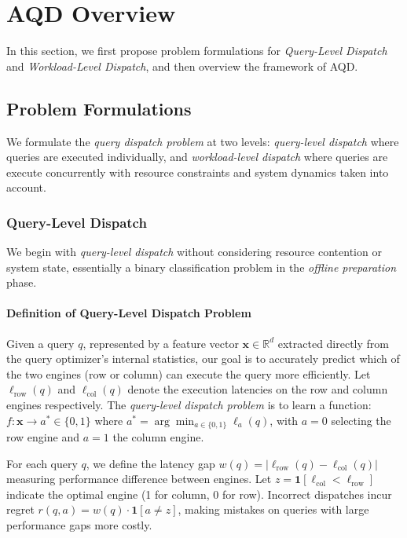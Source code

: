 \documentclass[sigconf, nonacm]{acmart}
\newcommand{\dispatcher}{AQD\xspace}
\begin{document}
\section{\dispatcher Overview}\label{sec:framework}
In this section, we first propose problem formulations for \emph{Query-Level Dispatch} and \emph{Workload-Level Dispatch}, and then overview the framework of \dispatcher.


\subsection{Problem Formulations}
We formulate the \textit{query dispatch problem} at two levels: \textit{query-level dispatch} where queries are executed individually, and \textit{workload-level dispatch} where queries are execute concurrently with resource constraints and system dynamics taken into account.

\subsubsection{Query-Level Dispatch}\label{sssec:offline_preparation}
We begin with \textit{query-level dispatch} without considering resource contention or system state, essentially a binary classification problem in the \textit{offline preparation} phase.

\paragraph{Definition of Query-Level Dispatch Problem}
Given a query $q$, represented by a feature vector $\mathbf{x} \in \mathbb{R}^d$ extracted directly from the query optimizer's internal statistics, our goal is to accurately predict which of the two engines (row or column) can execute the query more efficiently.
Let $\ell_{\text{row}}(q)$ and $\ell_{\text{col}}(q)$ denote the execution latencies on the row and column engines respectively. The \textit{query-level dispatch problem} is to learn a function:
\(
f: \mathbf{x} \longrightarrow a^* \in \{0,1\}
\)
where $a^* = \arg\min_{a \in \{0,1\}} \ell_a(q)$, with $a=0$ selecting the row engine and $a=1$ the column engine.


For each query $q$, we define the latency gap $w(q) = |\ell_{\text{row}}(q) - \ell_{\text{col}}(q)|$ measuring performance difference between engines. Let $z = \mathbf{1}[\ell_{\text{col}} < \ell_{\text{row}}]$ indicate the optimal engine (1 for column, 0 for row). Incorrect dispatches incur regret $r(q,a) = w(q) \cdot \mathbf{1}[a \neq z]$, making mistakes on queries with large performance gaps more costly.
\end{document}
